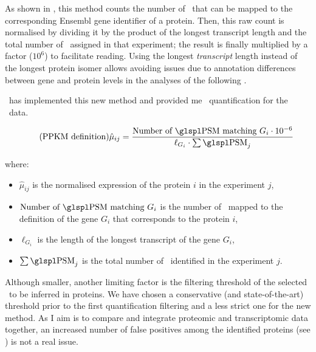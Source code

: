 As shown in ,
this method counts the number of \psms\
that can be mapped to the corresponding \gls{Ensembl} gene identifier of a protein.
Then, this raw count is normalised by dividing it
by the product of the longest transcript length and the total number of \psms\
assigned in that experiment;
the result is finally multiplied by a factor ($10^6$) to facilitate reading.
Using the longest \emph{transcript} length
instead of the longest protein isomer allows avoiding issues due to
annotation differences between gene and protein levels
in the analyses of the following \Cref{ch:Integration}.

\james\ has implemented this new method and provided me
\PPKM\ quantification for the \pandey\ data.

\begin{minipage}{\textwidth}
\begin{equation}\label{eq:PPKM}
    \tag{PPKM definition}
    \hat{\mu}_{ij} = \frac{\text{Number of \psms\ matching } G_i \cdot10^{-6}}{\ell_{G_i}\cdot\sum \text{\psms}_j}
\end{equation}

where:{\small
\begin{itemize}[topsep=0pt,nosep]
    \item $\hat{\mu}_{ij}$ is the normalised expression of the protein $i$
        in the experiment $j$,
    \item $\text{Number of \psms\ matching } G_i$ is the number of \psms\ mapped
        to the definition of the gene $G_i$ that corresponds to the protein $i$,
    \item $\ell_{G_i}$ is the length of the longest transcript of the gene $G_i$,
    \item $\sum \text{\psms}_j$ is the total number of \psms\ identified in
the experiment $j$.
\end{itemize}
}
\end{minipage}

Although smaller,
another limiting factor is the filtering threshold of the selected \psms\
to be inferred in proteins.
We have chosen a conservative (and state-of-the-art) threshold prior to
the first quantification filtering
and a less strict one for the new method.
As I aim is to compare and integrate proteomic and transcriptomic data together,
an increased number of false positives among the identified proteins
(see \Cref{subsub:peptideID}) is not a real issue.

